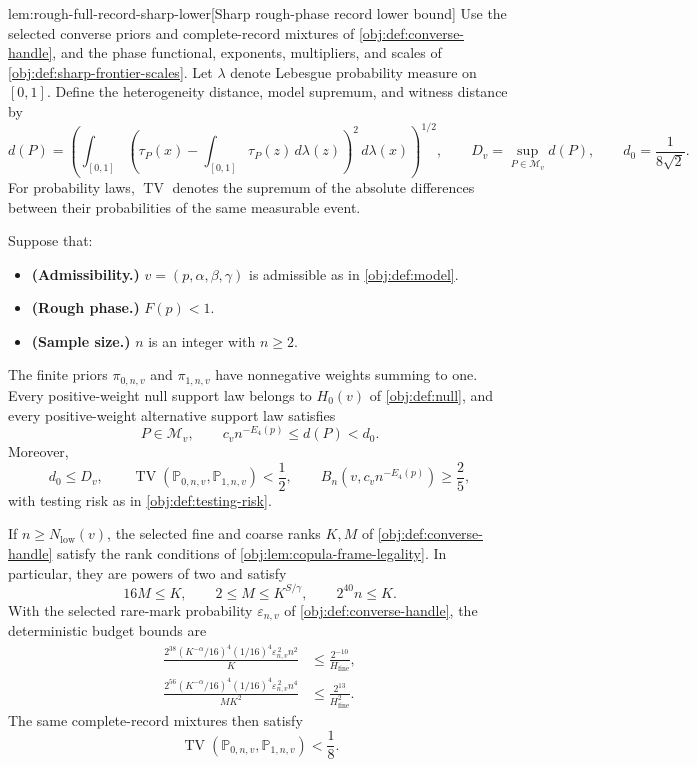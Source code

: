 \begin{lemmav}{lem:rough-full-record-sharp-lower}[Sharp rough-phase record lower bound]
Use the selected converse priors and complete-record mixtures of \cref{obj:def:converse-handle}, and the phase functional, exponents, multipliers, and scales of \cref{obj:def:sharp-frontier-scales}. Let \(\lambda\) denote Lebesgue probability measure on \([0,1]\). Define the heterogeneity distance, model supremum, and witness distance by
\[
d(P)=\left(\int_{[0,1]}
\left(\tau_P(x)-\int_{[0,1]}\tau_P(z)\,d\lambda(z)\right)^2
\,d\lambda(x)\right)^{1/2},
\qquad
D_v=\sup_{P\in\mathcal M_v}d(P),
\qquad
d_0=\frac{1}{8\sqrt2}.
\]
For probability laws, \(\operatorname{TV}\) denotes the supremum of the absolute differences between their probabilities of the same measurable event.

Suppose that:
\begin{itemize}
\item \textbf{(Admissibility.)} \(v=(p,\alpha,\beta,\gamma)\) is admissible as in \cref{obj:def:model}.
\item \textbf{(Rough phase.)} \(F(p)<1\).
\item \textbf{(Sample size.)} \(n\) is an integer with \(n\ge2\).
\end{itemize}
The finite priors \(\pi_{0,n,v}\) and \(\pi_{1,n,v}\) have nonnegative weights summing to one. Every positive-weight null support law belongs to \(H_0(v)\) of \cref{obj:def:null}, and every positive-weight alternative support law satisfies
\[
P\in\mathcal M_v,
\qquad
c_vn^{-E_4(p)}\le d(P)<d_0.
\]
Moreover,
\[
d_0\le D_v,
\qquad
\operatorname{TV}(\mathbb P_{0,n,v},\mathbb P_{1,n,v})<\frac12,
\qquad
B_n\!\left(v,c_vn^{-E_4(p)}\right)\ge\frac25,
\]
with testing risk as in \cref{obj:def:testing-risk}.

If \(n\ge N_{\mathrm{low}}(v)\), the selected fine and coarse ranks \(K,M\) of \cref{obj:def:converse-handle} satisfy the rank conditions of \cref{obj:lem:copula-frame-legality}. In particular, they are powers of two and satisfy
\[
16M\le K,
\qquad
2\le M\le K^{S/\gamma},
\qquad
2^{40}n\le K.
\]
With the selected rare-mark probability \(\varepsilon_{n,v}\) of \cref{obj:def:converse-handle}, the deterministic budget bounds are
\[
\begin{aligned}
\frac{2^{38}(K^{-\alpha}/16)^4(1/16)^4
      \varepsilon_{n,v}^{\,2}n^2}{K}
&\le \frac{2^{-10}}{H_{\mathrm{fine}}},\\
\frac{2^{56}(K^{-\alpha}/16)^4(1/16)^4
      \varepsilon_{n,v}^{\,2}n^4}{MK^2}
&\le \frac{2^{13}}{H_{\mathrm{fine}}^2}.
\end{aligned}
\]
The same complete-record mixtures then satisfy
\[
\operatorname{TV}(\mathbb P_{0,n,v},\mathbb P_{1,n,v})<\frac18.
\]


\end{lemmav}
